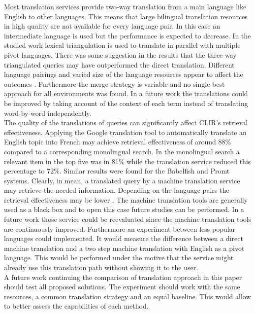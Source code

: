 \documentclass[journal]{IEEEtran}
\begin{document}
Most translation services provide two-way translation from a main language like English to other languages.
This means that large bilingual translation resources in high quality are not available for every language pair.
In this case an intermediate language is used but the performance is expected to decrease.
In the studied work lexical triangulation is used to translate in parallel with multiple pivot languages.
There was some suggestion in the results that the three-way triangulated queries may have outperformed the direct translation.
Different language pairings and varied size of the language resources appear to affect the outcomes \cite{gollins01}.
Furthermore the merge strategy is variable and no single best approach for all environments was found.
In a future work the translations could be improved by taking account of the context of each term instead of translating word-by-word independently.
\mbox{}\\

The quality of the translations of queries can significantly affect CLIR's retrieval effectiveness.
Applying the Google translation tool to automatically translate an English topic into French may achieve retrieval effectiveness of around 88\% compared to a corresponding monolingual search.
In the monolingual search a relevant item in the top five was in 81\% while the translation service reduced this percentage to 72\%.
Similar results were found for the Babelfish and Promt systems.
Clearly, in mean, a translated query by a machine translation service may retrieve the needed information.
Depending on the language pairs the retrieval effectiveness may be lower \cite{savoy09}.
The machine translation tools are generally used as a black box and to open this case future studies can be performed.
In a future work those service could be reevaluated since the machine translation tools are continuously improved.
Furthermore an experiment between less popular languages could implemented.
It would measure the difference between a direct machine translation and a two step machine translation with English as a pivot language.
This would be performed under the motive that the service might already use this translation path without showing it to the user.
\mbox{}\\

A future work continuing the comparison of translation approach in this paper should test all proposed solutions.
The experiment should work with the same resources, a common translation strategy and an equal baseline.
This would allow to better assess the capabilities of each method.





\end{document}
